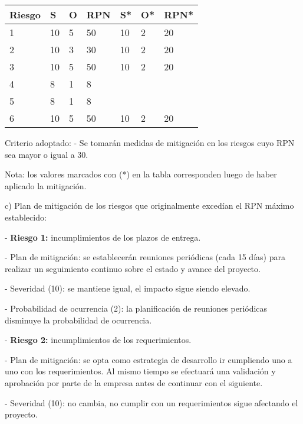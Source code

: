 \documentclass[11pt]{charter}
\begin{document}
\begin{table}[htpb]
\centering
\begin{tabularx}{\linewidth}{|X|X|X|X|X|X|X|}
\hline
\rowcolor[HTML]{C0C0C0} 
Riesgo & S & O & RPN & S* & O* & RPN* \\ \hline
 1      & 10 & 5  & \cellcolor [HTML] {FF3600} 50 &10  &2   & \cellcolor [HTML] {7CFC4F} 20    \\ \hline
 2      & 10 & 3  & \cellcolor [HTML] {FC8E4F} 30 &10  &2   & \cellcolor [HTML] {7CFC4F} 20    \\ \hline
 3      & 10 & 5  & \cellcolor [HTML] {FF3600} 50 &10  &2   & \cellcolor [HTML] {7CFC4F} 20    \\ \hline
 4      & 8  & 1  & \cellcolor [HTML] {7CFC4F} 8  &  &   & \\ \hline
 5      & 8  & 1  & \cellcolor [HTML] {7CFC4F} 8  &  &   & \\ \hline
 6      & 10 & 5  & \cellcolor [HTML] {FF3600} 50 &10  &2   & \cellcolor [HTML] {7CFC4F} 20   \\ \hline
\end{tabularx}%
\end{table}

Criterio adoptado:
	- Se tomarán medidas de mitigación en los riesgos cuyo RPN sea mayor o igual a 30.

Nota: los valores marcados con (*) en la tabla corresponden luego de haber aplicado la mitigación.

c) Plan de mitigación de los riesgos que originalmente excedían el RPN máximo establecido:
 
- \textbf{Riesgo 1:} incumplimientos de los plazos de entrega.
	
	- Plan de mitigación: se establecerán reuniones periódicas (cada 15 días) para realizar un seguimiento continuo sobre el estado y avance del proyecto. 
	
	- Severidad (10): se mantiene igual, el impacto sigue siendo elevado.
	
	- Probabilidad de ocurrencia (2): la planificación de reuniones periódicas disminuye la probabilidad de ocurrencia. 

- \textbf{Riesgo 2:} incumplimientos de los requerimientos.
	
	- Plan de mitigación: se opta como estrategia de desarrollo ir cumpliendo uno a uno con los requerimientos. Al mismo tiempo se efectuará una validación y aprobación por parte de la empresa antes de continuar con el siguiente.
	
	- Severidad (10): no cambia, no cumplir con un requerimientos sigue afectando el proyecto. 
	
\end{document}
